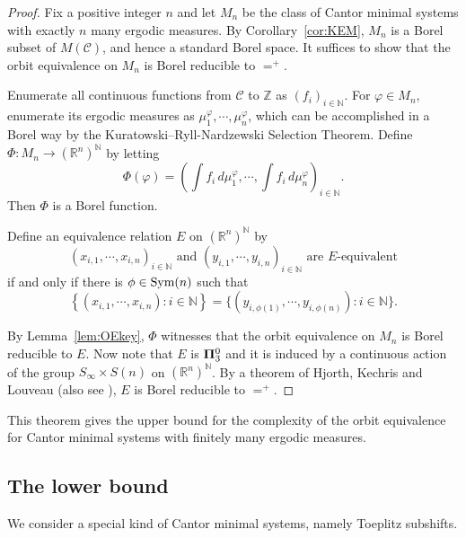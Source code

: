 \documentclass{amsart}
\theoremstyle{definition}
\theoremstyle{problem}
\theoremstyle{remark}
\numberwithin{equation}{section}
\begin{document}
\begin{proof} Fix a positive integer $n$ and let $M_n$ be the class of Cantor minimal systems with exactly $n$ many ergodic measures. By Corollary~\ref{cor:KEM}, $M_n$ is a Borel subset of $M(\mathcal{C})$, and hence a standard Borel space. It suffices to show that the orbit equivalence on $M_n$ is Borel reducible to $=^+$. 

Enumerate all continuous functions from $\mathcal{C}$ to $\mathbb{Z}$ as $(f_i)_{i\in\mathbb{N}}$. For $\varphi\in M_n$, enumerate its ergodic measures as $\mu^\varphi_1,\cdots,\mu^\varphi_n$, which can be accomplished in a Borel way by the Kuratowski--Ryll-Nardzewski Selection Theorem. Define $\Phi\colon M_n\to (\mathbb{R}^n)^\mathbb{N}$ by letting
$$ \Phi(\varphi)=\left(\int f_i\,d\mu^\varphi_1,\cdots,\int f_i\,d\mu^\varphi_n\right)_{i\in\mathbb{N}}. $$
Then $\Phi$ is a Borel function.

Define an equivalence relation $E$ on $(\mathbb{R}^n)^\mathbb{N}$ by
$$ (x_{i,1},\cdots,x_{i,n})_{i\in\mathbb{N}} \mbox{ and } (y_{i,1},\cdots,y_{i,n})_{i\in\mathbb{N}} \mbox{ are $E$-equivalent} $$
if and only if there is $\phi\in \mbox{\rm Sym}(n)$ such that 
$$\left\{ (x_{i,1},\cdots,x_{i,n})\colon i\in\mathbb{N}\right\}=\{(y_{i,\phi(1)},\cdots,y_{i,\phi(n)})\colon i\in\mathbb{N}\}. $$

By Lemma~\ref{lem:OEkey}, $\Phi$ witnesses that the orbit equivalence on $M_n$ is Borel reducible to $E$.  Now note that $E$ is ${\bf\Pi}^0_3$ and it is induced by a continuous action of the group $S_\infty\times S(n)$ on $(\mathbb{R}^n)^\mathbb{N}$. By a theorem of Hjorth, Kechris and Louveau \cite[Theorem 2]{HKL} (also see \cite[Theorem 12.5.5]{GaoBook}), $E$ is Borel reducible to $=^+$.
\end{proof}

This theorem gives the upper bound for the complexity of the orbit equivalence for Cantor minimal systems with finitely many ergodic measures. 


\subsection{The lower bound} We consider a special kind of Cantor minimal systems, namely Toeplitz subshifts. 
\end{document}
